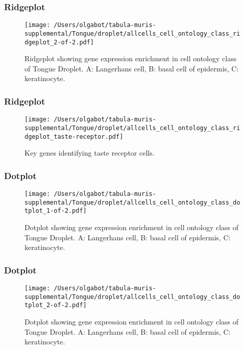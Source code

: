 \clearpage
\clearpage
\subsubsection{Ridgeplot}
\begin{figure}[h]
\centering
\texttt{[image: /Users/olgabot/tabula-muris-supplemental/Tongue/droplet/allcells\_cell\_ontology\_class\_ridgeplot\_2-of-2.pdf]}

\caption{ Ridgeplot  showing gene expression enrichment in cell ontology class of Tongue Droplet. A: Langerhans cell, B: basal cell of epidermis, C: keratinocyte.}
\end{figure}


\clearpage
\clearpage
\subsubsection{Ridgeplot}
\begin{figure}[h]
\centering
\texttt{[image: /Users/olgabot/tabula-muris-supplemental/Tongue/droplet/allcells\_cell\_ontology\_class\_ridgeplot\_taste-receptor.pdf]}

\caption{Key genes identifying taste receptor cells.
}
\end{figure}


\clearpage
\clearpage
\subsubsection{Dotplot}
\begin{figure}[h]
\centering
\texttt{[image: /Users/olgabot/tabula-muris-supplemental/Tongue/droplet/allcells\_cell\_ontology\_class\_dotplot\_1-of-2.pdf]}

\caption{ Dotplot  showing gene expression enrichment in cell ontology class of Tongue Droplet. A: Langerhans cell, B: basal cell of epidermis, C: keratinocyte.}
\end{figure}


\clearpage
\clearpage
\subsubsection{Dotplot}
\begin{figure}[h]
\centering
\texttt{[image: /Users/olgabot/tabula-muris-supplemental/Tongue/droplet/allcells\_cell\_ontology\_class\_dotplot\_2-of-2.pdf]}

\caption{ Dotplot  showing gene expression enrichment in cell ontology class of Tongue Droplet. A: Langerhans cell, B: basal cell of epidermis, C: keratinocyte.}
\end{figure}


